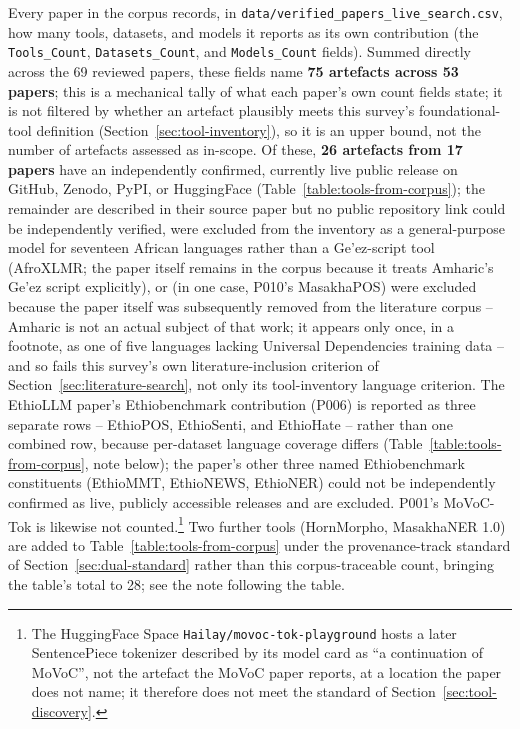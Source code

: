 \documentclass[sn-mathphys-num]{sn-jnl}
\theoremstyle{thmstyleone}
\theoremstyle{thmstyletwo}
\theoremstyle{thmstylethree}
\begin{document}
Every paper in the corpus records, in \texttt{data/verified\_papers\_live\_search.csv}, how many tools, datasets, and models it reports as its own contribution (the \texttt{Tools\_Count}, \texttt{Datasets\_Count}, and \texttt{Models\_Count} fields). Summed directly across the 69 reviewed papers, these fields name \textbf{75 artefacts across 53 papers}; this is a mechanical tally of what each paper's own count fields state; it is not filtered by whether an artefact plausibly meets this survey's foundational-tool definition (Section~\ref{sec:tool-inventory}), so it is an upper bound, not the number of artefacts assessed as in-scope. Of these, \textbf{26 artefacts from 17 papers} have an independently confirmed, currently live public release on GitHub, Zenodo, PyPI, or HuggingFace (Table~\ref{table:tools-from-corpus}); the remainder are described in their source paper but no public repository link could be independently verified, were excluded from the inventory as a general-purpose model for seventeen African languages rather than a Ge'ez-script tool (AfroXLMR; the paper itself remains in the corpus because it treats Amharic's Ge'ez script explicitly), or (in one case, P010's MasakhaPOS) were excluded because the paper itself was subsequently removed from the literature corpus -- Amharic is not an actual subject of that work; it appears only once, in a footnote, as one of five languages lacking Universal Dependencies training data \citep{dione_masakhapos_2023} -- and so fails this survey's own literature-inclusion criterion of Section~\ref{sec:literature-search}, not only its tool-inventory language criterion. The EthioLLM paper's Ethiobenchmark contribution (P006) is reported as three separate rows -- EthioPOS, EthioSenti, and EthioHate -- rather than one combined row, because per-dataset language coverage differs (Table~\ref{table:tools-from-corpus}, note below); the paper's other three named Ethiobenchmark constituents (EthioMMT, EthioNEWS, EthioNER) could not be independently confirmed as live, publicly accessible releases and are excluded. P001's MoVoC-Tok is likewise not counted.\footnote{The HuggingFace Space \texttt{Hailay/movoc-tok-playground} hosts a later SentencePiece tokenizer described by its model card as ``a continuation of MoVoC'', not the artefact the MoVoC paper reports, at a location the paper does not name; it therefore does not meet the standard of Section~\ref{sec:tool-discovery}.} Two further tools (HornMorpho, MasakhaNER 1.0) are added to Table~\ref{table:tools-from-corpus} under the provenance-track standard of Section~\ref{sec:dual-standard} rather than this corpus-traceable count, bringing the table's total to 28; see the note following the table.
\end{document}
